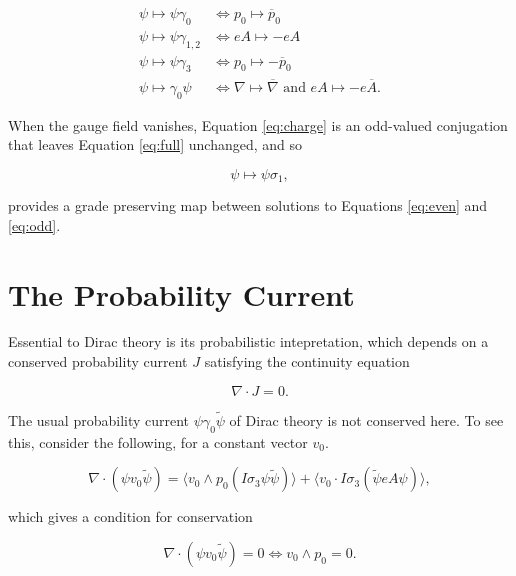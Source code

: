 \documentclass{article}
\begin{document}
  \begin{align}
    \psi \mapsto \psi \gamma_0 &\iff p_0 \mapsto \overline p_0 \\
    \psi \mapsto \psi \gamma_{1,2} &\iff e A \mapsto - eA \\
    \psi \mapsto \psi \gamma_3 &\iff p_0 \mapsto - \overline p_0\\
    \psi \mapsto \gamma_0 \psi &\iff \nabla \mapsto \overline \nabla \text{ and } eA \mapsto - e \overline A.
  \end{align}

  When the gauge field vanishes, Equation \ref{eq:charge} is an odd-valued conjugation that leaves Equation \ref{eq:full} unchanged, and so

  \begin{equation}
    \psi \mapsto \psi \sigma_1,
  \end{equation}

  provides a grade preserving map between solutions to Equations \ref{eq:even} and \ref{eq:odd}.

  \section{The Probability Current}\label{probability}

  Essential to Dirac theory is its probabilistic intepretation, which depends on a conserved probability current $J$ satisfying the continuity equation

  \begin{equation}
    \nabla \cdot J = 0.
  \end{equation}

  The usual probability current $\psi \gamma_0 \widetilde \psi$ of Dirac theory is not conserved here. To see this, consider the following, for a constant vector $v_0$.

  \begin{equation}
    \nabla \cdot (\psi v_0 \widetilde \psi) = \langle v_0 \wedge p_0 (I \sigma_3 \psi \widetilde \psi) \rangle + \langle v_0 \cdot I \sigma_3 (\widetilde \psi e A \psi) \rangle,\label{eq:current-expansion}
  \end{equation}

  which gives a condition for conservation

  \begin{equation}
    \nabla \cdot (\psi v_0 \widetilde \psi) = 0 \iff v_0 \wedge p_0 = 0.
  \end{equation}
\end{document}
